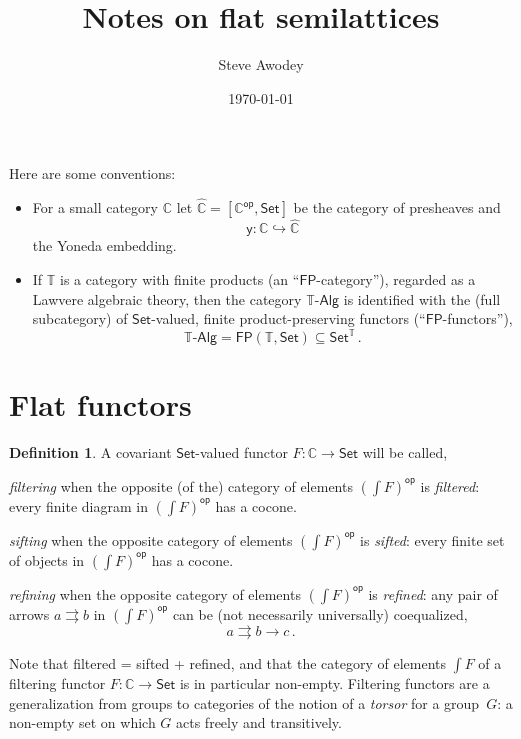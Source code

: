\documentclass[12pt]{article}
\newcommand{\C}{\ensuremath{\mathbb{C}}}
\newcommand{\T}{\ensuremath{\mathbb{T}}}
\newcommand{\op}[1]{\ensuremath{{#1}^{\mathsf{op}}}}
\newcommand{\psh}[1]{\ensuremath{[\op{#1},\mathsf{Set}]}}
\newcommand{\pshat}[1]{\ensuremath{\widehat{#1}}}
\newcommand{\Set}{\ensuremath{\mathsf{Set}}}
\newcommand{\y}{\ensuremath{\mathsf{y}}} %
\newcommand{\elem}[1]{\textstyle\int\!{#1}}%
\newcommand{\FP}{\ensuremath{\mathsf{FP}}}
\newcommand{\TAlg}{\ensuremath{\T\text{-}\mathsf{Alg}}}
\newcommand{\hook}{\ensuremath{\hookrightarrow}}
\renewcommand{\to}{\ensuremath{\rightarrow}}
\theoremstyle{remark}
\theoremstyle{definition}
\newtheorem{definition}[theorem]{Definition}
\begin{document}

\title{Notes on flat semilattices}
\author{Steve Awodey}
\date{\today}
\maketitle

Here are some conventions:
%
\begin{itemize}
\item For a small category $\C$ let $\pshat{\C} = \psh{\C}$ be the category of presheaves and
\[
\y : \C \hook\pshat{\C}
\]
the Yoneda embedding.
%
\item If $\T$ is a category with finite products (an ``$\FP$-category''), regarded as a Lawvere algebraic theory, then the category $\TAlg$ is identified with the (full subcategory) of $\Set$-valued, finite product-preserving functors (``$\FP$-functors''),
\[
\TAlg = \FP(\T, \Set) \subseteq \Set^\T\,.
\]

\end{itemize}

\section{Flat functors}

\begin{definition} A covariant $\Set$-valued functor $F : \C \to \Set$ will be called,
\begin{description}
\item{\emph{filtering}} when the opposite (of the) category of elements $\op{(\elem{F})}$ is \emph{filtered}: every finite diagram in $\op{(\elem{F})}$ has a cocone.

\item{\emph{sifting}} when the opposite category of elements $\op{(\elem{F})}$ is \emph{sifted}: every finite set of objects in $\op{(\elem{F})}$ has a cocone.

\item{\emph{refining}} when the opposite  category of elements $\op{(\elem{F})}$ is \emph{refined}: any pair of arrows $a \rightrightarrows b$ in $\op{(\elem{F})}$ can be (not necessarily universally) coequalized,
\[
a \rightrightarrows b \to c\,.
\]
\end{description}
\end{definition}

Note that filtered = sifted + refined, and that the category of elements $\elem{F}$ of a filtering functor $F : \C \to \Set$ is in particular non-empty.  Filtering functors are a generalization from groups to categories of the notion of a \emph{torsor} for a group~$G$:  a non-empty set on which $G$ acts freely and transitively.
\end{document}
